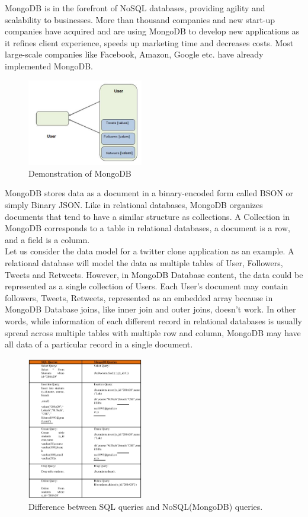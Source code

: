 \documentclass[conference]{IEEEtran}
\begin{document}
MongoDB is in the forefront of NoSQL databases, providing agility and scalability to businesses. More than thousand companies and new start-up companies have acquired and are using MongoDB to develop new applications as it refines client experience, speeds up marketing time and decreases costs. Most large-scale companies like Facebook, Amazon, Google etc. have already implemented MongoDB. \\

\begin{figure}[!ht]
	\centering
	\includegraphics[width=0.45\textwidth]{mongo.png}
	\caption{Demonstration of MongoDB\cite{b6}}
\end{figure}

MongoDB stores data as a document in a binary-encoded form called BSON or simply Binary JSON. Like in relational databases, MongoDB organizes documents that tend to have a similar structure as collections. A Collection in MongoDB corresponds to a table in relational databases, a document is a row, and a field is a column.\\

Let us consider the data model for a twitter clone application as an example. A relational database will model the data as multiple tables of User, Followers, Tweets and Retweets. However, in MongoDB Database content, the data could be represented as a single collection of Users. Each User’s document may contain followers, Tweets, Retweets, represented as an embedded array because in MongoDB Database joins, like inner join and outer joins, doesn't work. In other words, while information of each different record in relational databases is usually spread across multiple tables with multiple row and column, MongoDB may have all data of a particular record in a single document.

\begin{figure}[!ht]
	\centering
	\includegraphics[width=0.45\textwidth]{table-1.jpg}
	\caption{Difference between SQL queries and NoSQL(MongoDB) queries\cite{b6}.}
\end{figure}
\end{document}
